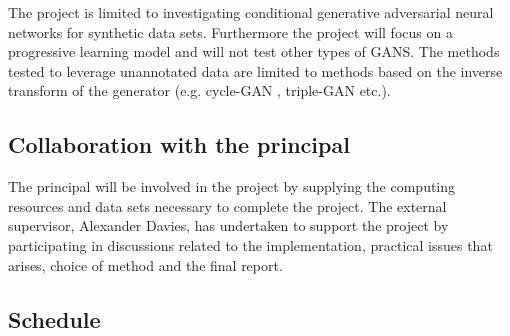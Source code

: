\documentclass[a4paper]{article}
\begin{document}
The project is limited to investigating conditional generative adversarial neural networks for synthetic data sets. Furthermore the project will focus on a progressive learning model and will not test other types of GANS. The methods tested to leverage unannotated data are limited to methods based on the inverse transform of the generator (e.g. cycle-GAN \cite{zhu2017unpaired}, triple-GAN\cite{li2017triple} etc.). 

\subsection{Collaboration with the principal}
The principal will be involved in the project by supplying the
computing resources and data sets necessary to complete the
project.
The external supervisor, Alexander Davies, has undertaken to support the project by participating in discussions related to the implementation, practical issues that arises, choice of method and the final report.

\subsection{Schedule}







\end{document}
